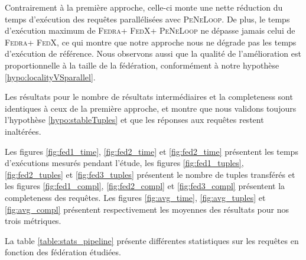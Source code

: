 \documentclass[a4paper]{article}
\def\fedra{\textsc{Fedra}\xspace}
\def\fedx{\textsc{FedX}\xspace}
\def\peneloop{\textsc{PeNeLoop}\xspace}
\begin{document}
Contrairement à la première approche, celle-ci monte une nette réduction du temps d'exécution des requêtes parallélisées avec \peneloop. De plus, le temps d'exécution maximum de \fedra + \fedx + \peneloop ne dépasse jamais celui de \fedra + \fedx, ce qui montre que notre approche nous ne dégrade pas les temps d'exécution de référence. Nous observons aussi que la qualité de l'amélioration est proportionnelle à la taille de la fédération, conformément à notre hypothèse \ref{hypo:localityVSparallel}.

Les résultats pour le nombre de résultats intermédiaires et la completeness sont identiques à ceux de la première approche, et montre que nous validons toujours l'hypothèse \ref{hypo:stableTuples} et que les réponses aux requêtes restent inaltérées.

Les figures \ref{fig:fed1_time}, \ref{fig:fed2_time} et \ref{fig:fed2_time} présentent les temps d'exécutions mesurés pendant l'étude, les figures \ref{fig:fed1_tuples}, \ref{fig:fed2_tuples} et \ref{fig:fed3_tuples} présentent le nombre de tuples transférés et les figures \ref{fig:fed1_compl}, \ref{fig:fed2_compl} et \ref{fig:fed3_compl} présentent la completeness des requêtes. Les figures \ref{fig:avg_time}, \ref{fig:avg_tuples} et \ref{fig:avg_compl} présentent respectivement les moyennes des résultats pour nos trois métriques.

La table \ref{table:stats_pipeline} présente différentes statistiques sur les requêtes en fonction des fédération étudiées.
\end{document}

